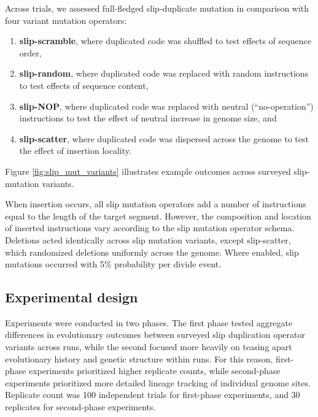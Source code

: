 Across trials, we assessed full-fledged slip-duplicate mutation in comparison with four variant mutation operators:
\begin{enumerate}
\item \textbf{slip-scramble}, where duplicated code was shuffled to test effects of sequence order,
\item \textbf{slip-random}, where duplicated code was replaced with random instructions to test effects of sequence content,
\item \textbf{slip-NOP}, where duplicated code was replaced with neutral (``no-operation'') instructions to test the effect of neutral increase in genome size, and
\item \textbf{slip-scatter}, where duplicated code was dispersed across the genome to test the effect of insertion locality.
\end{enumerate}
Figure \ref{fig:slip_mut_variants} illustrates example outcomes across surveyed slip-mutation variants.

When insertion occurs, all slip mutation operators add a number of instructions equal to the length of the target segment.
However, the composition and location of inserted instructions vary according to the slip mutation operator schema.
Deletions acted identically across slip mutation variants, except slip-scatter, which randomized deletions uniformly across the genome.
Where enabled, slip mutations occurred with 5\% probability per divide event.

\subsection{Experimental design}

Experiments were conducted in two phases.
The first phase tested aggregate differences in evolutionary outcomes between surveyed slip duplication operator variants across runs, while the second focused more heavily on teasing apart evolutionary history and genetic structure within runs.
For this reason, first-phase experiments prioritized higher replicate counts, while second-phase experiments prioritized more detailed lineage tracking of individual genome sites.
Replicate count was 100 independent trials for first-phase experiments, and 30 replicates for second-phase experiments.

